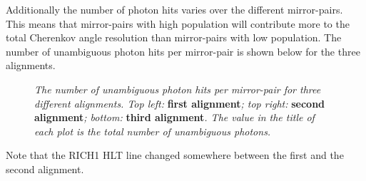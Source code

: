 Additionally the number of photon hits varies over the different mirror-pairs. This means that mirror-pairs with high population will contribute more to the total Cherenkov angle resolution than mirror-pairs with low population. The number of unambiguous photon hits per mirror-pair is shown below for the three alignments.\\
\begin{figure}[!h]
	\vspace*{-0.cm}
	\begin{center}
		\vspace*{-0.5cm}
	\end{center}
	\caption{\textit{The number of unambiguous photon hits per mirror-pair for three different alignments. Top left:} \textbf{first alignment}\textit{; top right:} \textbf{second alignment}\textit{; bottom:} \textbf{third alignment}\textit{. The value in the title of each plot is the total number of unambiguous photons. } }
	\label{fig:rich1entries}
\end{figure}
Note that the RICH1 HLT line changed somewhere between the first and the second alignment.\\
\\

